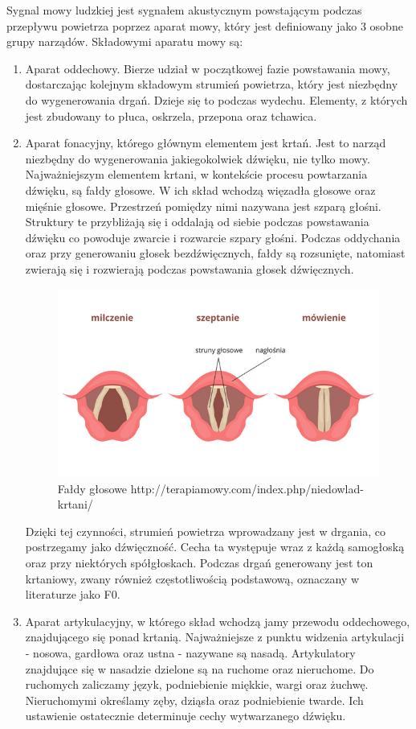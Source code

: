 \documentclass[a4paper,12 pt]{article}
\begin{document}
Sygnal mowy ludzkiej jest sygnałem akustycznym powstającym podczas przepływu powietrza poprzez aparat mowy, który jest definiowany jako 3 osobne grupy narządów. 
Składowymi aparatu mowy są:
\begin{enumerate}
\item Aparat oddechowy. Bierze udział w początkowej fazie powstawania mowy, dostarczając kolejnym składowym strumień powietrza, który jest niezbędny do wygenerowania drgań. Dzieje się to podczas wydechu. Elementy, z których jest zbudowany to płuca, oskrzela, przepona oraz tchawica.

\item Aparat fonacyjny, którego głównym elementem jest krtań. Jest to narząd niezbędny do wygenerowania jakiegokolwiek dźwięku, nie tylko mowy. Najważniejszym elementem krtani, w kontekście procesu powtarzania dźwięku, są fałdy głosowe. W ich skład wchodzą więzadła głosowe oraz mięśnie głosowe. Przestrzeń pomiędzy nimi nazywana jest szparą głośni. Struktury te przybliżają się i oddalają od siebie podczas powstawania dźwięku co powoduje zwarcie i rozwarcie szpary głośni. Podczas oddychania oraz przy generowaniu głosek bezdźwięcznych, fałdy są rozsunięte, natomiast zwierają się  i rozwierają podczas powstawania głosek dźwięcznych. 

\begin{figure}[!htbp]

\centering
\includegraphics[scale=0.5]{faldy_glosowe}
\caption{Fałdy głosowe http://terapiamowy.com/index.php/niedowlad-krtani/}

\end{figure}
\FloatBarrier

Dzięki tej czynności, strumień powietrza wprowadzany jest w drgania, co postrzegamy jako dźwięczność. Cecha ta występuje wraz z każdą samogłoską oraz przy niektórych spółgłoskach. Podczas drgań generowany jest ton krtaniowy, zwany również częstotliwością podstawową, oznaczany w literaturze jako F0. 
\item Aparat artykulacyjny, w którego skład wchodzą jamy przewodu oddechowego, znajdującego się ponad krtanią. Najważniejsze z punktu widzenia artykulacji - nosowa, gardłowa oraz ustna - nazywane są nasadą. Artykulatory znajdujące się w nasadzie dzielone są na ruchome oraz nieruchome. Do ruchomych zaliczamy język, podniebienie miękkie, wargi oraz żuchwę. Nieruchomymi określamy zęby, dziąsła oraz podniebienie twarde. Ich ustawienie ostatecznie determinuje cechy wytwarzanego dźwięku. 
\end{enumerate}
\end{document}
